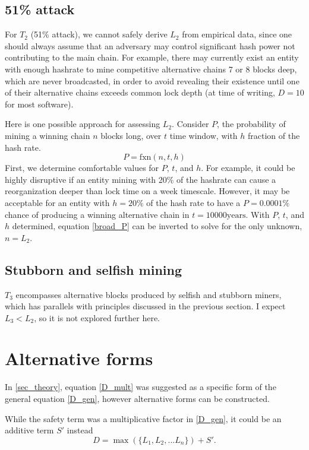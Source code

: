 \documentclass{mrl}
\begin{document}
\subsection{51\% attack}
For $T_2$ (51\% attack), we cannot safely derive $L_2$ from empirical data, since one should always assume that an adversary may control significant hash power not contributing to the main chain. For example, there may currently exist an entity with enough hashrate to mine competitive alternative chains 7 or 8 blocks deep, which are never broadcasted, in order to avoid revealing their existence until one of their alternative chains exceeds common lock depth (at time of writing, $D = 10$ for most software). 

Here is one possible approach for assessing $L_2$. Consider $P$, the probability of mining a winning chain $n$ blocks long, over $t$ time window, with $h$ fraction of the hash rate. 
\begin{equation}P = \mathrm{fxn}(n, t, h)\label{broad_P}\end{equation}
First, we determine comfortable values for $P$, $t$, and $h$. For example, it could be highly disruptive if an entity mining with 20\% of the hashrate can cause a reorganization deeper than lock time on a week timescale. However, it may be acceptable for an entity with $h=20\%$ of the hash rate to have a $P=0.0001\%$ chance of producing a winning alternative chain in $t = 10000 \mathrm{ years}$. With $P$, $t$, and $h$ determined, equation \ref{broad_P} can be inverted to solve for the only unknown, $n = L_2$.

\subsection{Stubborn and selfish mining}
$T_3$ encompasses alternative blocks produced by selfish and stubborn miners, which has parallels with principles discussed in the previous section. I expect $L_3 < L_2$, so it is not explored further here.

\section{Alternative forms}
In \ref{sec_theory}, equation \ref{D_mult} was suggested as a specific form of the general equation \ref{D_gen}, however alternative forms can be constructed.

While the safety term was a multiplicative factor in \ref{D_gen}, it could be an additive term $S'$ instead
\begin{equation}D = \max(\{L_1, L_2, ... L_n\}) + S'. \label{D_add} \end{equation}
\end{document}
